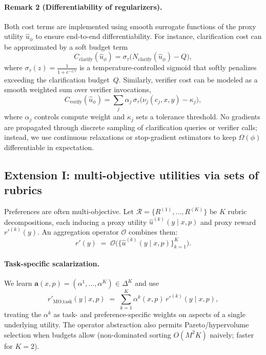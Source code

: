 \documentclass[sigconf]{acmart}
\begin{document}
\paragraph{Remark 2 (Differentiability of regularizers).}
Both cost terms are implemented using smooth surrogate functions of the proxy 
utility $\hat u_\phi$ to ensure end-to-end differentiability.  
For instance, clarification cost can be approximated by a soft budget term 
\[
C_{\mathrm{clarify}}(\hat u_\phi)
= \sigma_\tau\!\big(N_{\mathrm{clarify}}(\hat u_\phi) - Q\big),
\]
where $\sigma_\tau(z)=\frac{1}{1+e^{-z/\tau}}$ is a temperature-controlled
sigmoid that softly penalizes exceeding the clarification budget~$Q$.  
Similarly, verifier cost can be modeled as a smooth weighted sum over verifier
invocations,
\[
C_{\mathrm{verify}}(\hat u_\phi)
= \sum_j \alpha_j\,\sigma_\tau\!\big(\nu_j(c_j,x,y)-\kappa_j\big),
\]
where $\alpha_j$ controls compute weight and $\kappa_j$ sets a tolerance
threshold.  
No gradients are propagated through discrete sampling of clarification queries
or verifier calls; instead, we use continuous relaxations or stop-gradient
estimators to keep $\Omega(\phi)$ differentiable in expectation.



\subsection{Extension I: multi-objective utilities via sets of rubrics}\label{sec:mo}

Preferences are often multi-objective. Let \(\mathcal{R}=\{R^{(1)},\dots,R^{(K)}\}\) be \(K\) rubric decompositions, each inducing a proxy utility \(\hat u^{(k)}(y\mid x,p)\) and proxy reward \(r'^{(k)}(y)\). An aggregation operator \(\mathcal{O}\) combines them:
\begin{equation}
r'(y)\;=\;\mathcal{O}\!\big(\{\hat u^{(k)}(y\mid x,p)\}_{k=1}^K\big).
\end{equation}
\paragraph{Task-specific scalarization.} 
We learn \(\mathbf{a}(x,p)=(\alpha^1,\dots,\alpha^K)\in\Delta^K\) and use
\begin{equation}
r'_{\text{MO,task}}(y\mid x,p)\;=\;\sum_{k=1}^K \alpha^k(x,p)\,r'^{(k)}(y\mid x,p),
\end{equation}
treating the \(\alpha^k\) as task- and preference-specific weights on aspects of a single underlying utility. The operator abstraction also permits Pareto/hypervolume selection when budgets allow (non-dominated sorting \(O(M^2K)\) naively; faster for \(K{=}2\)).
\end{document}
